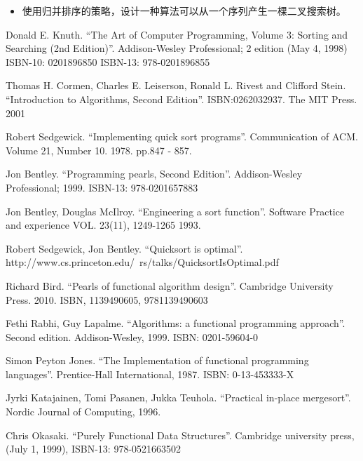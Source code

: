 \documentclass[UTF8]{article}
\begin{document}
\begin{Exercise}
  \begin{itemize}
    \item 使用归并排序的策略，设计一种算法可以从一个序列产生一棵二叉搜索树。
  \end{itemize}
\end{Exercise}

\ifx\wholebook\relax\else

\begin{thebibliography}{99}

Donald E. Knuth. ``The Art of Computer Programming, Volume 3: Sorting and Searching (2nd Edition)''. Addison-Wesley Professional; 2 edition (May 4, 1998) ISBN-10: 0201896850 ISBN-13: 978-0201896855

Thomas H. Cormen, Charles E. Leiserson, Ronald L. Rivest and Clifford Stein.
``Introduction to Algorithms, Second Edition''. ISBN:0262032937. The MIT Press. 2001

Robert Sedgewick. ``Implementing quick sort programs''. Communication of ACM. Volume 21, Number 10. 1978. pp.847 - 857.

Jon Bentley. ``Programming pearls, Second Edition''. Addison-Wesley Professional; 1999. ISBN-13: 978-0201657883

Jon Bentley, Douglas McIlroy. ``Engineering a sort function''. Software Practice and experience VOL. 23(11), 1249-1265 1993.

Robert Sedgewick, Jon Bentley. ``Quicksort is optimal''. http://www.cs.princeton.edu/~rs/talks/QuicksortIsOptimal.pdf

Richard Bird. ``Pearls of functional algorithm design''. Cambridge University Press. 2010. ISBN, 1139490605, 9781139490603

Fethi Rabhi, Guy Lapalme. ``Algorithms: a functional programming approach''. Second edition. Addison-Wesley, 1999. ISBN: 0201-59604-0

Simon Peyton Jones. ``The Implementation of functional programming languages''. Prentice-Hall International, 1987. ISBN: 0-13-453333-X

Jyrki Katajainen, Tomi Pasanen, Jukka Teuhola. ``Practical in-place mergesort''. Nordic Journal of Computing, 1996.

Chris Okasaki. ``Purely Functional Data Structures''. Cambridge university press, (July 1, 1999), ISBN-13: 978-0521663502


\end{thebibliography}
\end{document}
